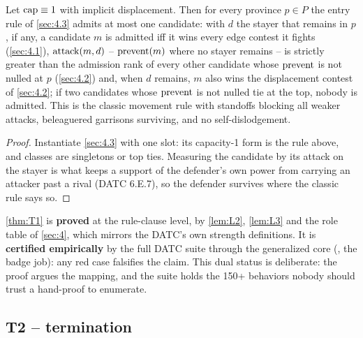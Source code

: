 \documentclass[12pt,a4paper]{article}
\begin{document}
\begin{lemma}\label{lem:L3}
Let $\operatorname{cap} \equiv 1$ with implicit displacement.
Then for every province $p \in P$ the entry rule of \cref{sec:4.3} admits at most one candidate: with $d$ the stayer that remains in $p$, if any, a candidate $m$ is admitted iff it wins every edge contest it fights (\cref{sec:4.1}), $\operatorname{attack}(m, d)$ -- $\operatorname{prevent}(m)$ where no stayer remains -- is strictly greater than the admission rank of every other candidate whose $\operatorname{prevent}$ is not nulled at $p$ (\cref{sec:4.2}) and, when $d$ remains, $m$ also wins the displacement contest of \cref{sec:4.2}; if two candidates whose $\operatorname{prevent}$ is not nulled tie at the top, nobody is admitted.
This is the classic movement rule with standoffs blocking all weaker attacks, beleaguered garrisons surviving, and no self-dislodgement.
\end{lemma}
\begin{proof}
Instantiate \cref{sec:4.3} with one slot: its capacity-1 form is the rule above, and classes are singletons or top ties.
Measuring the candidate by its attack on the stayer is what keeps a support of the defender's own power from carrying an attacker past a rival (DATC 6.E.7), so the defender survives where the classic rule says so.
\end{proof}

\begin{status}
\cref{thm:T1} is \textbf{proved} at the rule-clause level, by \cref{lem:L2}, \cref{lem:L3} and the role table of \cref{sec:4}, which mirrors the DATC's own strength definitions.
It is \textbf{certified empirically} by the full DATC suite through the generalized core (, the badge job): any red case falsifies the claim.
This dual status is deliberate: the proof argues the mapping, and the suite holds the 150+ behaviors nobody should trust a hand-proof to enumerate.
\end{status}

\subsection{T2 -- termination}\label{sec:8.2}
\end{document}
